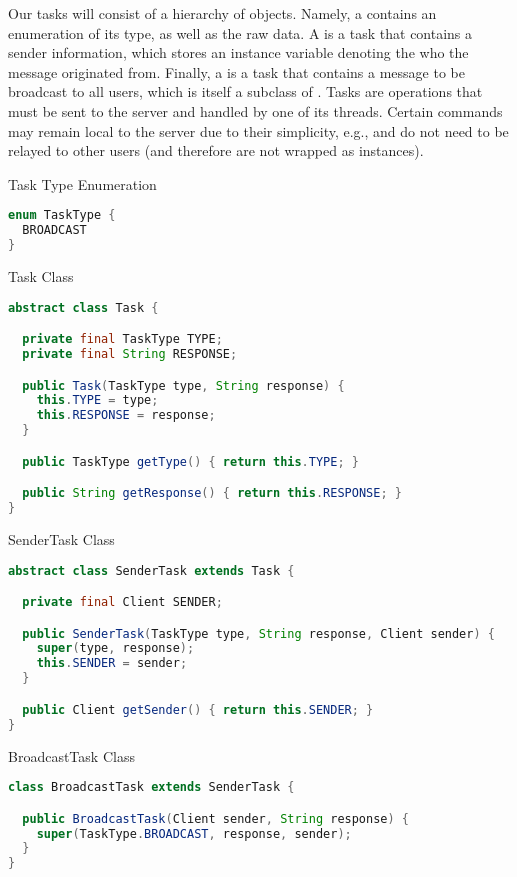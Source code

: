 Our tasks will consist of a hierarchy of objects. Namely, a  contains an enumeration of its type, as well as the raw data. A  is a task that contains a sender information, which stores an instance variable denoting the  who the message originated from. Finally, a  is a task that contains a message to be broadcast to all users, which is itself a subclass of . Tasks are operations that must be sent to the server and handled by one of its threads. Certain commands may remain local to the server due to their simplicity, e.g.,  and  do not need to be relayed to other users (and therefore are not wrapped as  instances). 

\begin{cl}{Task Type Enumeration}
\begin{lstlisting}[language=Java]
enum TaskType {
  BROADCAST
}
\end{lstlisting}
\end{cl}

\begin{cl}{Task Class}
\begin{lstlisting}[language=Java]
abstract class Task {

  private final TaskType TYPE;
  private final String RESPONSE;

  public Task(TaskType type, String response) {
    this.TYPE = type;
    this.RESPONSE = response;
  }

  public TaskType getType() { return this.TYPE; }

  public String getResponse() { return this.RESPONSE; }
}
\end{lstlisting}
\end{cl}

\begin{cl}{SenderTask Class}
\begin{lstlisting}[language=Java]
abstract class SenderTask extends Task {

  private final Client SENDER;

  public SenderTask(TaskType type, String response, Client sender) {
    super(type, response);
    this.SENDER = sender;
  }

  public Client getSender() { return this.SENDER; }
}
\end{lstlisting}
\end{cl}

\begin{cl}{BroadcastTask Class}
\begin{lstlisting}[language=Java]
class BroadcastTask extends SenderTask {

  public BroadcastTask(Client sender, String response) {
    super(TaskType.BROADCAST, response, sender);
  }
}
\end{lstlisting}
\end{cl}

